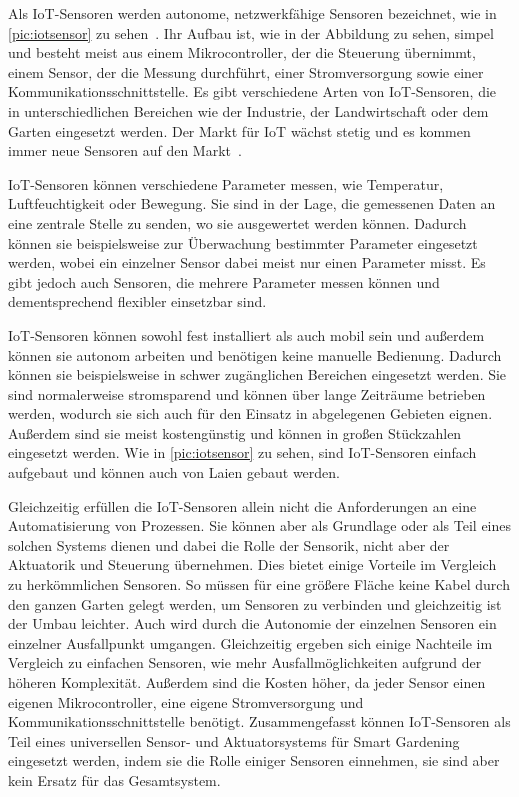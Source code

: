 Als IoT-Sensoren werden autonome, netzwerkfähige Sensoren bezeichnet, wie in \cref{pic:iotsensor} zu sehen~\cite{IoTSensor}.
Ihr Aufbau ist, wie in der Abbildung zu sehen, simpel und besteht meist aus einem Mikrocontroller, der die Steuerung übernimmt, einem Sensor, der die Messung durchführt, einer Stromversorgung sowie einer Kommunikationsschnittstelle.
Es gibt verschiedene Arten von IoT-Sensoren, die in unterschiedlichen Bereichen wie der Industrie, der Landwirtschaft oder dem Garten eingesetzt werden.
Der Markt für IoT wächst stetig und es kommen immer neue Sensoren auf den Markt~\cite{IoTSensorenAbsatz}.

IoT-Sensoren können verschiedene Parameter messen, wie Temperatur, Luftfeuchtigkeit oder Bewegung.
Sie sind in der Lage, die gemessenen Daten an eine zentrale Stelle zu senden, wo sie ausgewertet werden können.
Dadurch können sie beispielsweise zur Überwachung bestimmter Parameter eingesetzt werden, wobei ein einzelner Sensor dabei meist nur einen Parameter misst.
Es gibt jedoch auch Sensoren, die mehrere Parameter messen können und dementsprechend flexibler einsetzbar sind.

IoT-Sensoren können sowohl fest installiert als auch mobil sein und außerdem können sie autonom arbeiten und benötigen keine manuelle Bedienung.
Dadurch können sie beispielsweise in schwer zugänglichen Bereichen eingesetzt werden.
Sie sind normalerweise stromsparend und können über lange Zeiträume betrieben werden, wodurch sie sich auch für den Einsatz in abgelegenen Gebieten eignen.
Außerdem sind sie meist kostengünstig und können in großen Stückzahlen eingesetzt werden.
Wie in \cref{pic:iotsensor} zu sehen, sind IoT-Sensoren einfach aufgebaut und können auch von Laien gebaut werden.

Gleichzeitig erfüllen die IoT-Sensoren allein nicht die Anforderungen an eine Automatisierung von Prozessen.
Sie können aber als Grundlage oder als Teil eines solchen Systems dienen und dabei die Rolle der Sensorik, nicht aber der Aktuatorik und Steuerung übernehmen.
Dies bietet einige Vorteile im Vergleich zu herkömmlichen Sensoren.
So müssen für eine größere Fläche keine Kabel durch den ganzen Garten gelegt werden, um Sensoren zu verbinden und gleichzeitig ist der Umbau leichter.
Auch wird durch die Autonomie der einzelnen Sensoren ein einzelner Ausfallpunkt umgangen.
Gleichzeitig ergeben sich einige Nachteile im Vergleich zu einfachen Sensoren, wie mehr Ausfallmöglichkeiten aufgrund der höheren Komplexität.
Außerdem sind die Kosten höher, da jeder Sensor einen eigenen Mikrocontroller, eine eigene Stromversorgung und Kommunikationsschnittstelle benötigt.
Zusammengefasst können IoT-Sensoren als Teil eines universellen Sensor- und Aktuatorsystems für Smart Gardening eingesetzt werden, indem sie die Rolle einiger Sensoren einnehmen, sie sind aber kein Ersatz für das Gesamtsystem.




